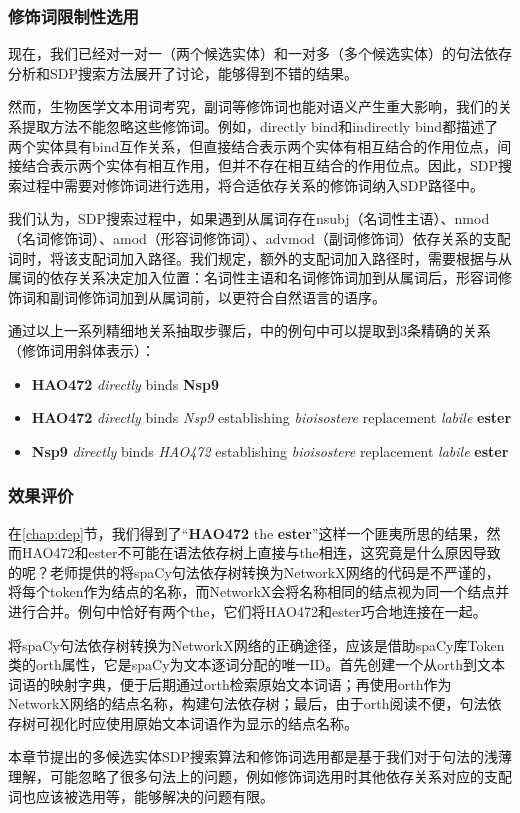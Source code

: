 \documentclass[twocolumn]{article}
\begin{document}
\subsubsection{修饰词限制性选用\label{chap:modifier}}
现在，我们已经对一对一（两个候选实体）和一对多（多个候选实体）的句法依存分析和SDP搜索方法展开了讨论，能够得到不错的结果。\par
然而，生物医学文本用词考究，副词等修饰词也能对语义产生重大影响，我们的关系提取方法不能忽略这些修饰词。例如，directly bind和indirectly bind都描述了两个实体具有bind互作关系，但直接结合表示两个实体有相互结合的作用位点，间接结合表示两个实体有相互作用，但并不存在相互结合的作用位点。因此，SDP搜索过程中需要对修饰词进行选用，将合适依存关系的修饰词纳入SDP路径中。\par
我们认为，SDP搜索过程中，如果遇到从属词存在nsubj（名词性主语）、nmod（名词修饰词）、amod（形容词修饰词）、advmod（副词修饰词）依存关系的支配词时，将该支配词加入路径。我们规定，额外的支配词加入路径时，需要根据与从属词的依存关系决定加入位置：名词性主语和名词修饰词加到从属词后，形容词修饰词和副词修饰词加到从属词前，以更符合自然语言的语序。\par
通过以上一系列精细地关系抽取步骤后，\cite{hao472}中的例句中可以提取到3条精确的关系（修饰词用斜体表示）：\par
\begin{itemize}
	\item \textbf{HAO472} \textit{directly} binds \textbf{Nsp9}
	\item \textbf{HAO472} \textit{directly} binds \textit{Nsp9} establishing \textit{bioisostere} replacement \textit{labile} \textbf{ester}
	\item \textbf{Nsp9} \textit{directly} binds \textit{HAO472} establishing \textit{bioisostere} replacement \textit{labile} \textbf{ester}
\end{itemize}\par

\subsubsection{效果评价\label{chap:dep_eva}}
在\ref{chap:dep}节，我们得到了“\textbf{HAO472} the \textbf{ester}”这样一个匪夷所思的结果，然而HAO472和ester不可能在语法依存树上直接与the相连，这究竟是什么原因导致的呢？老师提供的将spaCy句法依存树转换为NetworkX网络的代码是不严谨的，将每个token作为结点的名称，而NetworkX会将名称相同的结点视为同一个结点并进行合并。例句中恰好有两个the，它们将HAO472和ester巧合地连接在一起。\par
将spaCy句法依存树转换为NetworkX网络的正确途径，应该是借助spaCy库Token类的orth属性，它是spaCy为文本逐词分配的唯一ID。首先创建一个从orth到文本词语的映射字典，便于后期通过orth检索原始文本词语；再使用orth作为NetworkX网络的结点名称，构建句法依存树；最后，由于orth阅读不便，句法依存树可视化时应使用原始文本词语作为显示的结点名称。\par
本章节提出的多候选实体SDP搜索算法和修饰词选用都是基于我们对于句法的浅薄理解，可能忽略了很多句法上的问题，例如修饰词选用时其他依存关系对应的支配词也应该被选用等，能够解决的问题有限。\par
\end{document}
